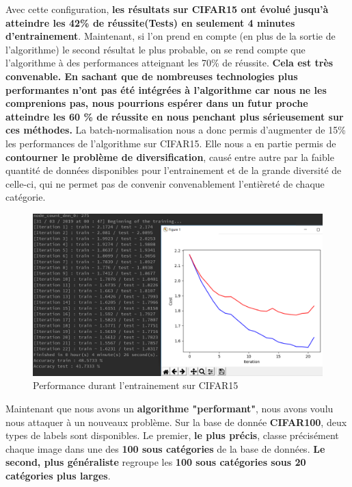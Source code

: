 \documentclass[12pt,a4paper]{extarticle}
\begin{document}
Avec cette configuration, \textbf{les résultats sur CIFAR15 ont évolué jusqu'à atteindre les 42\% de réussite(Tests) en seulement 4 minutes d'entrainement}. Maintenant, si l'on prend en compte (en plus de la sortie de l'algorithme) le second résultat le plus probable, on se rend compte que l'algorithme à des performances atteignant les 70\% de réussite. \textbf{Cela est très convenable. En sachant que de nombreuses technologies plus performantes n'ont pas été intégrées à l'algorithme car nous ne les comprenions pas, nous pourrions espérer dans un futur proche atteindre les 60 \% de réussite en nous penchant plus sérieusement sur ces méthodes.} La batch-normalisation nous a donc permis d'augmenter de 15\% les performances de l'algorithme sur CIFAR15. Elle nous a en partie permis de \textbf{contourner le problème de diversification}, causé entre autre par la faible quantité de données disponibles pour l'entrainement et de la grande diversité de celle-ci, qui ne permet pas de convenir convenablement l'entièreté de chaque catégorie. 
 \begin{figure}[h]
\centering
\includegraphics[width=16cm]{answer_to_life_m}
\caption{Performance durant l'entrainement sur CIFAR15}
\end{figure}
\newpage
Maintenant que nous avons un \textbf{algorithme "performant"}, nous avons voulu nous attaquer à un nouveaux problème. Sur la base de donnée \textbf{CIFAR100}, deux types de labels sont disponibles. Le premier, \textbf{le plus précis}, classe précisément chaque image dans une des \textbf{100 sous catégories} de la base de données. \textbf{Le second, plus généraliste }regroupe les \textbf{100 sous catégories sous 20 catégories plus larges}.
\end{document}

